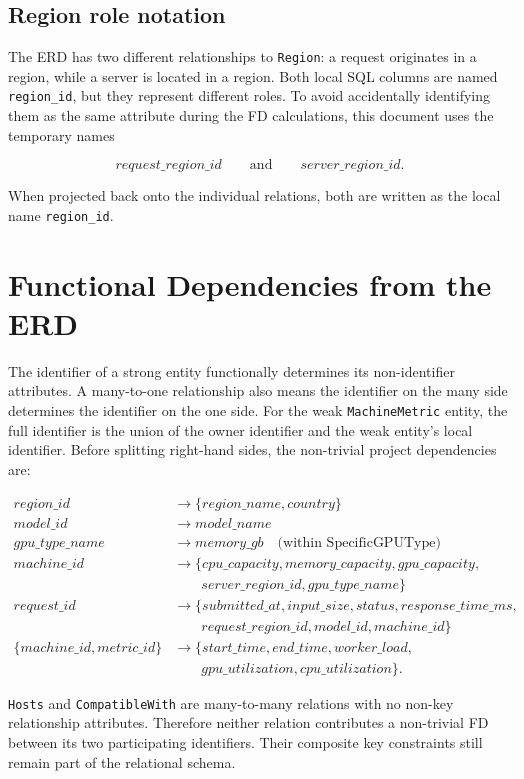 \documentclass[11pt]{article}
\newcommand{\fd}{\rightarrow}
\newcommand{\code}[1]{\texttt{#1}}
\begin{document}
\subsection*{Region role notation}

The ERD has two different relationships to \code{Region}: a request originates in
a region, while a server is located in a region. Both local SQL columns are named
\code{region\_id}, but they represent different roles. To avoid accidentally
identifying them as the same attribute during the FD calculations, this document
uses the temporary names

\[
request\_region\_id \qquad\text{and}\qquad server\_region\_id.
\]

When projected back onto the individual relations, both are written as the local name \code{region\_id}.

\section{Functional Dependencies from the ERD}

The identifier of a strong entity
functionally determines its non-identifier attributes. A many-to-one relationship
also means the identifier on the many side determines the identifier on the one
side. For the weak \code{MachineMetric} entity, the full identifier is the union of
the owner identifier and the weak entity's local identifier. Before splitting right-hand sides, the non-trivial project dependencies are:

\begin{align*}
region\_id &\fd \{region\_name, country\}\\
model\_id &\fd model\_name\\
gpu\_type\_name &\fd memory\_gb \quad \text{(within SpecificGPUType)}\\
machine\_id &\fd \{cpu\_capacity, memory\_capacity, gpu\_capacity,\\
&\qquad server\_region\_id, gpu\_type\_name\}\\
request\_id &\fd \{submitted\_at, input\_size, status, response\_time\_ms,\\
&\qquad request\_region\_id, model\_id, machine\_id\}\\
\{machine\_id, metric\_id\} &\fd \{start\_time, end\_time, worker\_load,\\
&\qquad gpu\_utilization, cpu\_utilization\}.
\end{align*}

\code{Hosts} and \code{CompatibleWith} are many-to-many relations with no
non-key relationship attributes. Therefore neither relation contributes a
non-trivial FD between its two participating identifiers. Their composite key
constraints still remain part of the relational schema.
\end{document}
